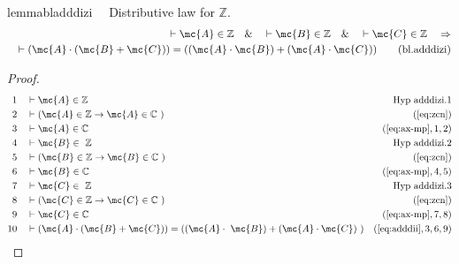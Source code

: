 \begin{restatable}{lemma}{bladddizi}~~ Distributive law for $\mathbb{Z}$.
\begin{align}
\vdash \mc{A} \in \mathbb{Z}\quad\&\quad \vdash \mc{B} \in
    \mathbb{Z}\quad\&\quad \vdash \mc{C} \in \mathbb{Z}\quad\Rightarrow \notag \\ 
	\quad
    \vdash ( \mc{A} \cdot ( \mc{B} + \mc{C} ) ) = ( ( \mc{A} \cdot \mc{B} ) + (
    \mc{A} \cdot \mc{C} ) )\label{eq:bl.adddizi}\tag{bl.adddizi}
\end{align}
\end{restatable}

\begin{proof}
\begin{align}
  1 &&  & \vdash \mc{A} \in \mathbb{Z}&\text{Hyp~adddizi.1}\notag%
  \\ 2 &&  & \vdash ( \mc{A} \in \mathbb{Z} \rightarrow \mc{A} \in \mathbb{C}
     ~)&(\mbox{\ref{eq:zcn}})\notag
  \\ 3 &&  & \vdash \mc{A} \in \mathbb{C}&(\mbox{\ref{eq:ax-mp}},1,2)\notag
  \\ 4 &&  & \vdash \mc{B} \in
     ~\mathbb{Z}&\text{Hyp~adddizi.2}\notag%
  \\ 5 &&  & \vdash ( \mc{B} \in \mathbb{Z} \rightarrow \mc{B} \in \mathbb{C}
     ~)&(\mbox{\ref{eq:zcn}})\notag
  \\ 6 &&  & \vdash \mc{B} \in \mathbb{C}&(\mbox{\ref{eq:ax-mp}},4,5)\notag
  \\ 7 &&  & \vdash \mc{C} \in
     ~\mathbb{Z}&\text{Hyp~adddizi.3}\notag%
  \\ 8 &&  & \vdash ( \mc{C} \in \mathbb{Z} \rightarrow \mc{C} \in \mathbb{C}
     ~)&(\mbox{\ref{eq:zcn}})\notag
  \\ 9 &&  & \vdash \mc{C} \in \mathbb{C}&(\mbox{\ref{eq:ax-mp}},7,8)\notag
  \\ 10 &&  & \vdash ( \mc{A} \cdot ( \mc{B} + \mc{C} ) ) = ( ( \mc{A} \cdot
     ~\mc{B} ) + ( \mc{A} \cdot \mc{C} )
     ~)&(\mbox{\ref{eq:adddii}},3,6,9)\notag
\end{align}
\end{proof}

